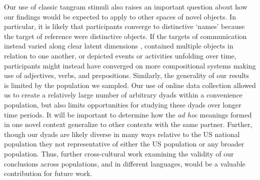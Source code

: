 \documentclass[alpha-refs]{wiley-article}
\begin{document}
Our use of classic tangram stimuli also raises an important question about how our findings would be expected to apply to other spaces of novel objects.
In particular, it is likely that participants converge to distinctive `names' because the target of reference were distinctive objects.
If the targets of communication instead varied along clear latent dimensions \citep[e.g.][]{nolle2018emergence}, contained multiple objects in relation to one another, or depicted events or activities unfolding over time, participants might instead have converged on more compositional systems making use of adjectives, verbs, and prepositions.
Similarly, the generality of our results is limited by the population we sampled.
Our use of online data collection allowed us to create a relatively large number of arbitrary dyads within a convenience population, but also limits opportunities for studying these dyads over longer time periods.
It will be important to determine how the \emph{ad hoc} meanings formed in one novel context generalize to other contexts with the same partner.
Further, though our dyads are likely diverse in many ways relative to the US national population \citep{levay2016demographic} they not representative of either the US population or any broader population.
Thus, further cross-cultural work examining the validity of our conclusions across populations, and in different languages, would be a valuable contribution for future work.
\end{document}

